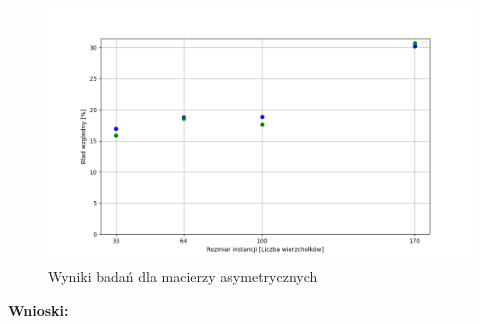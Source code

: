 \documentclass{article}
\begin{document}
        \begin{figure}[ht]
          \centering
          \includegraphics[width=\textwidth]{src/plots/asymTsNeighMet.png}
          \caption{Wyniki badań dla macierzy asymetrycznych}
          \label{fig:asymNeighg}
        \end{figure}
        \FloatBarrier
        \textbf{Wnioski: }
\end{document}
